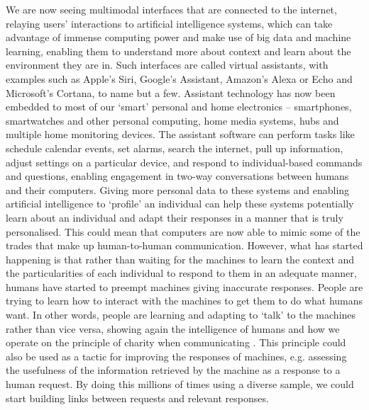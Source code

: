 We are now seeing multimodal interfaces that are connected to the internet, relaying users' interactions to artificial intelligence systems, which can take advantage of immense computing power and make use of big data and machine learning, enabling them to understand more about context and learn about the environment they are in. Such interfaces are called virtual assistants, with examples such as Apple's Siri, Google's Assistant, Amazon's Alexa or Echo and Microsoft's Cortana, to name but a few. Assistant technology has now been embedded to most of our `smart' personal and home electronics -- smartphones, smartwatches and other personal computing, home media systems, hubs and multiple home monitoring devices. The assistant software can perform tasks like schedule calendar events, set alarms, search the internet, pull up information, adjust settings on a particular device, and respond to individual-based commands and questions, enabling engagement in two-way conversations between humans and their computers. Giving more personal data to these systems and enabling artificial intelligence to `profile' an individual can help these systems potentially learn about an individual and adapt their responses in a manner that is truly personalised. This could mean that computers are now able to mimic some of the trades that make up human-to-human communication. However, what has started happening is that rather than waiting for the machines to learn the context and the particularities of each individual to respond to them in an adequate manner, humans have started to preempt machines giving inaccurate responses. People are trying to learn how to interact with the machines to get them to do what humans want. In other words, people are learning and adapting to `talk' to the machines rather than vice versa, showing again the intelligence of humans and how we operate on the principle of charity when communicating \citet{herbert_paul_grice_logic_1975}. This principle could also be used as a tactic for improving the responses of machines, e.g. assessing the usefulness of the information retrieved by the machine as a response to a human request. By doing this millions of times using a diverse sample, we could start building links between requests and relevant responses.

